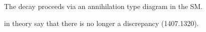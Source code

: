 
The decay \btodsphi proceeds via an annihilation type diagram in the SM.


in theory say that there is no longer a discrepancy (1407.1320).
























\cite{PDG2012}
